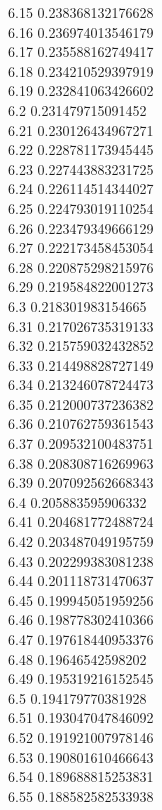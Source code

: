 {6.15	0.238368132176628\\
6.16	0.236974013546179\\
6.17	0.235588162749417\\
6.18	0.234210529397919\\
6.19	0.232841063426602\\
6.2	0.231479715091452\\
6.21	0.230126434967271\\
6.22	0.228781173945445\\
6.23	0.227443883231725\\
6.24	0.226114514344027\\
6.25	0.224793019110254\\
6.26	0.223479349666129\\
6.27	0.222173458453054\\
6.28	0.220875298215976\\
6.29	0.219584822001273\\
6.3	0.218301983154665\\
6.31	0.217026735319133\\
6.32	0.215759032432852\\
6.33	0.214498828727149\\
6.34	0.213246078724473\\
6.35	0.212000737236382\\
6.36	0.210762759361543\\
6.37	0.209532100483751\\
6.38	0.208308716269963\\
6.39	0.207092562668343\\
6.4	0.205883595906332\\
6.41	0.204681772488724\\
6.42	0.203487049195759\\
6.43	0.202299383081238\\
6.44	0.201118731470637\\
6.45	0.199945051959256\\
6.46	0.198778302410366\\
6.47	0.197618440953376\\
6.48	0.19646542598202\\
6.49	0.195319216152545\\
6.5	0.194179770381928\\
6.51	0.193047047846092\\
6.52	0.191921007978146\\
6.53	0.190801610466643\\
6.54	0.189688815253831\\
6.55	0.188582582533938\\
}
